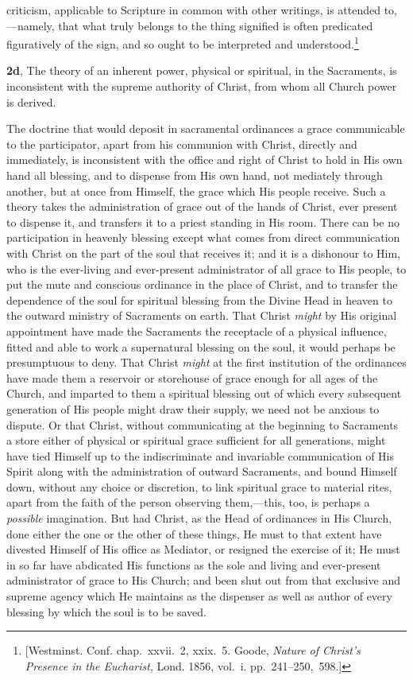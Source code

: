 \documentclass[
  english,
]{book}
\begin{document}
criticism, applicable to Scripture in common with other writings, is attended to,---namely, that what truly belongs to the thing signified is often predicated figuratively of the sign, and so ought to be interpreted and understood.\footnote{{[}Westminst. Conf. chap.~xxvii.~2, xxix.~5. Goode, \emph{Nature of Christ's Presence in the Eucharist}, Lond. 1856, vol.~i. pp.~241--250,~598.{]}}

\textbf{2d}, The theory of an inherent power, physical or spiritual, in the Sacraments, is inconsistent with the supreme authority of Christ, from whom all Church power is derived.

The doctrine that would deposit in sacramental ordinances a grace communicable to the participator, apart from his communion with Christ, directly and immediately, is inconsistent with the office and right of Christ to hold in His own hand all blessing, and to dispense from His own hand, not mediately through another, but at once from Himself, the grace which His people receive. Such a theory takes the administration of grace out of the hands of Christ, ever present to dispense it, and transfers it to a priest standing in His room. There can be no participation in heavenly blessing except what comes from direct communication with Christ on the part of the soul that receives it; and it is a dishonour to Him, who is the ever-living and ever-present administrator of all grace to His people, to put the mute and conscious ordinance in the place of Christ, and to transfer the dependence of the soul for spiritual blessing from the Divine Head in heaven to the outward ministry of Sacraments on earth. That Christ \emph{might} by His original appointment have made the Sacraments the receptacle of a physical influence, fitted and able to work a supernatural blessing on the soul, it would perhaps be presumptuous to deny. That Christ \emph{might} at the first institution of the ordinances have made them a reservoir or storehouse of grace enough for all ages of the Church, and imparted to them a spiritual blessing out of which every subsequent generation of His people might draw their supply, we need not be anxious to dispute. Or that Christ, without communicating at the beginning to Sacraments a store either of physical or spiritual grace sufficient for all generations, might have tied Himself up to the indiscriminate and invariable communication of His Spirit along with the administration of outward Sacraments, and bound Himself down, without any choice or discretion, to link spiritual grace to material rites, apart from the faith of the person observing them,---this, too, is perhaps a \emph{possible} imagination. But had Christ, as the Head of ordinances in His Church, done either the one or the other of these things, He must to that extent have divested Himself of His office as Mediator, or resigned the exercise of it; He must in so far have abdicated His functions as the sole and living and ever-present administrator of grace to His Church; and been shut out from that exclusive and supreme agency which He maintains as the dispenser as well as author of every blessing by which the soul is to be saved.
\end{document}
